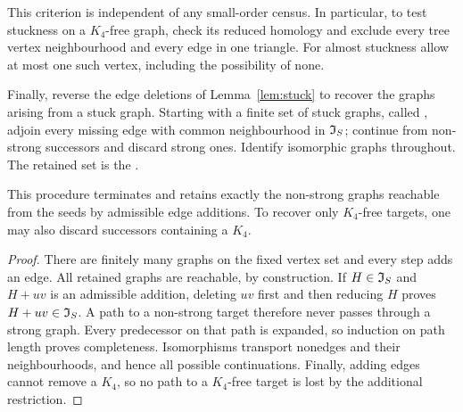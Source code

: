 This criterion is independent of any small-order census. In particular,
to test stuckness on a $K_4$-free graph, check its reduced homology and
exclude every tree vertex neighbourhood and every edge in one triangle.
For almost stuckness allow at most one such vertex, including the
possibility of none.

Finally, reverse the edge deletions of Lemma~\ref{lem:stuck} to recover
the graphs arising from a stuck graph. Starting with a finite set of
stuck graphs, called , adjoin every missing edge with common neighbourhood in
$\mathfrak I_S$; continue from non-strong successors and discard strong ones.
Identify isomorphic graphs throughout. The retained set is the
.

\begin{proposition}\label{prop:closure-correct}
This procedure terminates and retains exactly the non-strong graphs
reachable from the seeds by admissible edge additions. To recover
only $K_4$-free targets, one may also discard successors containing
a $K_4$.
\end{proposition}
\begin{proof}
There are finitely many graphs on the fixed vertex set and every
step adds an edge. All retained graphs are reachable, by construction.
If $H\in\mathfrak I_S$ and $H+uv$ is an admissible addition, deleting $uv$
first and then reducing $H$ proves $H+uv\in\mathfrak I_S$. A path to a
non-strong target therefore never passes through a strong graph.
Every predecessor on that path is expanded, so induction on path
length proves completeness. Isomorphisms transport nonedges and
their neighbourhoods, and hence all possible continuations.
Finally, adding edges cannot remove a $K_4$, so no path to a
$K_4$-free target is lost by the additional restriction.
\end{proof}
